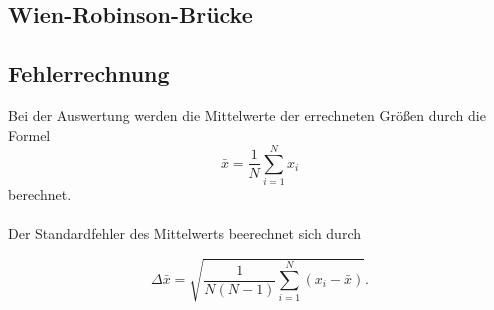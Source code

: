 \subsection{Wien-Robinson-Brücke}
\subsection{Fehlerrechnung}
Bei der Auswertung werden die Mittelwerte 
der errechneten Größen durch die Formel
\begin{equation}
    \bar{x}=\frac{1}{N}\sum_{i=1}^N x_i
\end{equation}
berechnet.\\ 
\\
Der Standardfehler des Mittelwerts beerechnet sich durch

 \begin{equation}
     \Delta\bar{x}=\sqrt{\frac{1}{N(N-1)}\sum_{i=1}^N (x_i-\bar{x})}.
 \end{equation}
